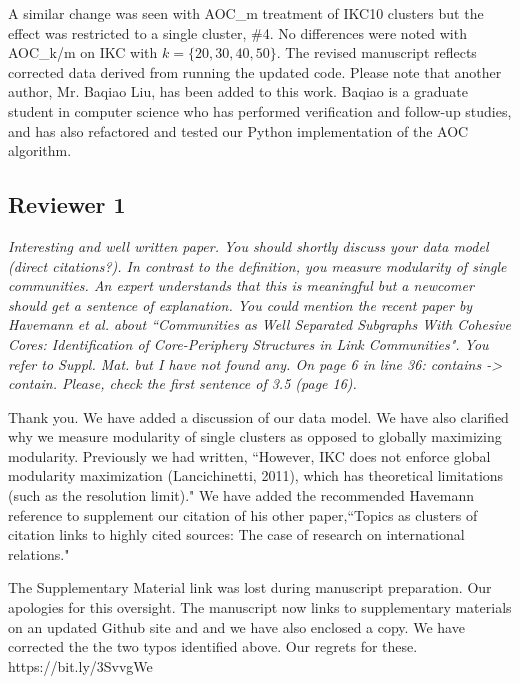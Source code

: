 \documentclass[11pt, oneside]{article}   	%
\begin{document}
\noindent A similar change was seen with AOC\_m treatment of IKC10 clusters but the effect was restricted to a single cluster, \#4. No differences were noted with AOC\_k/m on IKC with $k=\{20,30,40, 50\}$. 
The revised manuscript reflects corrected data derived from running the updated code. 
Please note that another author, Mr. Baqiao Liu, has been added to this work. Baqiao is a graduate student in computer science who
has performed verification and follow-up studies, and has also refactored and tested our Python implementation of the AOC algorithm.


\subsection*{Reviewer 1} \emph{Interesting and well written paper. You should shortly discuss your data model (direct citations?). In contrast to the definition, you measure modularity of single communities. An expert understands that this is meaningful but a newcomer should get a sentence of explanation.  You could mention the recent paper by Havemann et al. about ``Communities as Well Separated Subgraphs With Cohesive Cores: Identification of Core-Periphery Structures in Link Communities". You refer to Suppl. Mat. but I have not found any. On page 6 in line 36: contains -> contain. Please, check the first sentence of 3.5 (page 16).}

\vspace{2 mm}
Thank you. We have added a discussion of our data model. We have also clarified why we measure modularity of single clusters as opposed to globally maximizing modularity. Previously we had written, ``However, 
IKC does not enforce global modularity maximization (Lancichinetti, 2011), which has theoretical limitations (such as the resolution limit)." We have added the recommended  Havemann reference to supplement 
our citation of his other paper,``Topics as clusters of citation links to highly cited sources: The case of research on international relations." 

The Supplementary Material link was lost during manuscript preparation. Our apologies for this oversight. The manuscript now links to supplementary materials on an updated
Github site and and we have also enclosed a copy. We have corrected the the two typos identified above. Our regrets for these. \\

https://bit.ly/3SvvgWe\\

\clearpage
\end{document}
